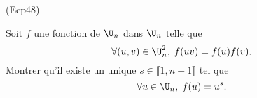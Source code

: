 \begin{tiny}(Ecp48)\end{tiny} Soit $f$ une fonction de $\U_n$ dans $\U_n$ telle que 
\[
  \forall (u,v) \in\U_n^2, \; f(uv) = f(u) f(v).
\]
Montrer qu'il existe un unique $s \in \llbracket 1, n-1 \rrbracket$ tel que 
\[
  \forall u \in \U_n, \; f(u) = u^s.
\]
